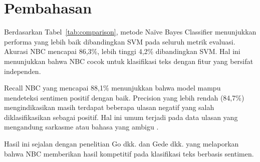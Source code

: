 \section{Pembahasan}

Berdasarkan Tabel~\ref{tab:comparison}, metode Na\"ive Bayes Classifier menunjukkan performa yang lebih baik dibandingkan SVM pada seluruh metrik evaluasi. Akurasi NBC mencapai 86,3\%, lebih tinggi 4,2\% dibandingkan SVM. Hal ini menunjukkan bahwa NBC cocok untuk klasifikasi teks dengan fitur yang bersifat independen.

Recall NBC yang mencapai 88,1\% menunjukkan bahwa model mampu mendeteksi sentimen positif dengan baik. Precision yang lebih rendah (84,7\%) mengindikasikan masih terdapat beberapa ulasan negatif yang salah diklasifikasikan sebagai positif. Hal ini umum terjadi pada data ulasan yang mengandung sarkasme atau bahasa yang ambigu \cite{gewang2022}.

Hasil ini sejalan dengan penelitian Go dkk. \cite{go2019} dan Gede dkk. \cite{gewang2022} yang melaporkan bahwa NBC memberikan hasil kompetitif pada klasifikasi teks berbasis sentimen.
